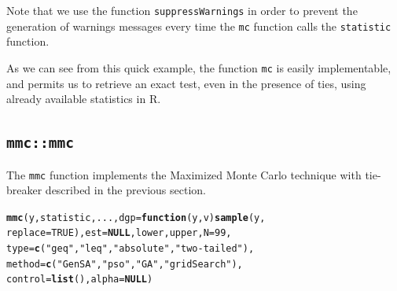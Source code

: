 \documentclass[11pt]{article}\usepackage[]{graphicx}\usepackage[]{color}
\makeatletter
\newcommand{\hlnum}[1]{\textcolor[rgb]{0.686,0.059,0.569}{#1}}%
\newcommand{\hlstr}[1]{\textcolor[rgb]{0.192,0.494,0.8}{#1}}%
\newcommand{\hlstd}[1]{\textcolor[rgb]{0.345,0.345,0.345}{#1}}%
\newcommand{\hlkwa}[1]{\textcolor[rgb]{0.161,0.373,0.58}{\textbf{#1}}}%
\newcommand{\hlkwc}[1]{\textcolor[rgb]{0.333,0.667,0.333}{#1}}%
\newcommand{\hlkwd}[1]{\textcolor[rgb]{0.737,0.353,0.396}{\textbf{#1}}}%
\newenvironment{kframe}{%
 \def\at@end@of@kframe{}%
 \ifinner\ifhmode%
  \def\at@end@of@kframe{\end{minipage}}%
  \begin{minipage}{\columnwidth}%
 \fi\fi%
 \def\FrameCommand##1{\hskip\@totalleftmargin \hskip-\fboxsep
 \colorbox{shadecolor}{##1}\hskip-\fboxsep
     \hskip-\linewidth \hskip-\@totalleftmargin \hskip\columnwidth}%
 \MakeFramed {\advance\hsize-\width
   \@totalleftmargin\z@ \linewidth\hsize
   \@setminipage}}%
 {\par\unskip\endMakeFramed%
 \at@end@of@kframe}
\newenvironment{knitrout}{}{} %
\let\proglang=\textsf
\let\code=\texttt
\makeatother
\begin{document}
	Note that we use the function \code{suppressWarnings} in order to prevent the generation of warnings messages every time the \code{mc} function calls the \code{statistic} function.

	As we can see from this quick example, the function \code{mc} is easily implementable, and permits us to retrieve an exact test, even in the presence of ties, using already available statistics in \proglang{R}.

\subsection{\code{mmc::mmc}}

The \code{mmc} function implements the Maximized Monte Carlo technique with tie-breaker described in the previous section.
\begin{knitrout}
\color{fgcolor}\begin{kframe}
\begin{alltt}
\hlkwd{mmc}\hlstd{(y, statistic, ...,} \hlkwc{dgp} \hlstd{=} \hlkwa{function}\hlstd{(}\hlkwc{y}\hlstd{,} \hlkwc{v}\hlstd{)} \hlkwd{sample}\hlstd{(y,}
    \hlkwc{replace} \hlstd{=} \hlnum{TRUE}\hlstd{),} \hlkwc{est} \hlstd{=} \hlkwa{NULL}\hlstd{, lower, upper,} \hlkwc{N} \hlstd{=} \hlnum{99}\hlstd{,}
    \hlkwc{type} \hlstd{=} \hlkwd{c}\hlstd{(}\hlstr{"geq"}\hlstd{,} \hlstr{"leq"}\hlstd{,} \hlstr{"absolute"}\hlstd{,} \hlstr{"two-tailed"}\hlstd{),}
    \hlkwc{method} \hlstd{=} \hlkwd{c}\hlstd{(}\hlstr{"GenSA"}\hlstd{,} \hlstr{"pso"}\hlstd{,} \hlstr{"GA"}\hlstd{,} \hlstr{"gridSearch"}\hlstd{),}
    \hlkwc{control} \hlstd{=} \hlkwd{list}\hlstd{(),} \hlkwc{alpha} \hlstd{=} \hlkwa{NULL}\hlstd{)}
\end{alltt}
\end{kframe}
\end{knitrout}
\end{document}
